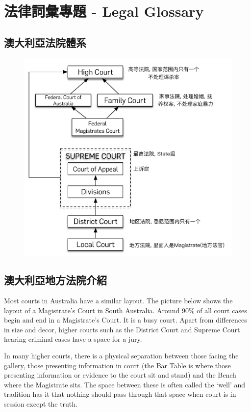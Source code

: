 \chapter{法律詞彙專題 - Legal Glossary}
\section{澳大利亞法院體系}
\begin{figure}[H]
  \centering
  \includegraphics{pics/court.pdf}
\end{figure}



\section{澳大利亞地方法院介紹}
Most courts in Australia have a similar layout. The picture below shows the layout of a Magistrate’s Court in South Australia. Around 90\% of all court cases begin and end in a Magistrate’s Court. It is a busy court. Apart from differences in size and decor, higher courts such as the District Court and Supreme Court hearing criminal cases have a space for a jury.

In many higher courts, there is a physical separation between those facing the gallery, those presenting information in court (the Bar Table is where those presenting information or evidence to the court sit and stand) and the Bench where the Magistrate sits. The space between these is often called the `well' and tradition has it that nothing should pass through that space when court is in session except the truth.

